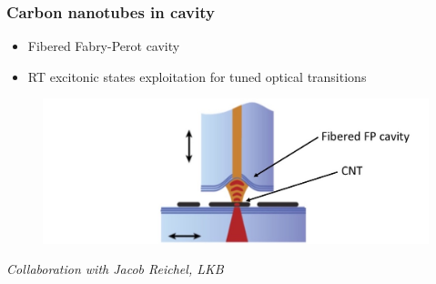 \documentclass[xcolor = {dvipsnames}]{beamer}
\begin{document}
\begin{frame}
	\frametitle{Carbon nanotubes in cavity}
	\begin{itemize}
	\item <1-> Fibered Fabry-Perot cavity
	\item  <1-> RT excitonic states exploitation for tuned optical transitions
	\end{itemize}
	\hspace{0.5cm}
	\vspace{-0.5cm}

	\begin{figure}[h!]
\includegraphics[width=.9\textwidth]{images/cavity}
	\end{figure}
	\emph{\scriptsize Collaboration with Jacob Reichel, LKB}
	\end{frame}
\end{document}
